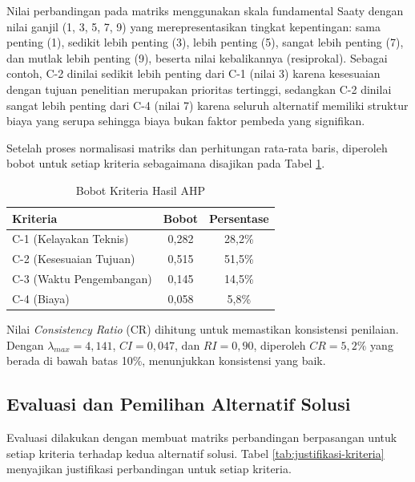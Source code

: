 Nilai perbandingan pada matriks menggunakan skala fundamental Saaty dengan nilai ganjil (1, 3, 5, 7, 9) yang merepresentasikan tingkat kepentingan: sama penting (1), sedikit lebih penting (3), lebih penting (5), sangat lebih penting (7), dan mutlak lebih penting (9), beserta nilai kebalikannya (resiprokal). Sebagai contoh, C-2 dinilai sedikit lebih penting dari C-1 (nilai 3) karena kesesuaian dengan tujuan penelitian merupakan prioritas tertinggi, sedangkan C-2 dinilai sangat lebih penting dari C-4 (nilai 7) karena seluruh alternatif memiliki struktur biaya yang serupa sehingga biaya bukan faktor pembeda yang signifikan.

Setelah proses normalisasi matriks dan perhitungan rata-rata baris, diperoleh bobot untuk setiap kriteria sebagaimana disajikan pada Tabel \ref{tab:bobot-kriteria}.

\begin{table}[H]
  \caption{Bobot Kriteria Hasil AHP}
  \label{tab:bobot-kriteria}
  \begin{tabular}{| l | c | c |}
    \hline
    \textbf{Kriteria} & \textbf{Bobot} & \textbf{Persentase} \\
    \hline
    C-1 (Kelayakan Teknis)   & 0,282 & 28,2\% \\
    \hline
    C-2 (Kesesuaian Tujuan)  & 0,515 & 51,5\% \\
    \hline
    C-3 (Waktu Pengembangan) & 0,145 & 14,5\% \\
    \hline
    C-4 (Biaya)              & 0,058 & 5,8\% \\
    \hline
  \end{tabular}
\end{table}

Nilai \textit{Consistency Ratio} (CR) dihitung untuk memastikan konsistensi penilaian. Dengan $\lambda_{max} = 4{,}141$, $CI = 0{,}047$, dan $RI = 0{,}90$, diperoleh $CR = 5{,}2\%$ yang berada di bawah batas 10\%, menunjukkan konsistensi yang baik.

\subsection{Evaluasi dan Pemilihan Alternatif Solusi}

Evaluasi dilakukan dengan membuat matriks perbandingan berpasangan untuk setiap kriteria terhadap kedua alternatif solusi. Tabel \ref{tab:justifikasi-kriteria} menyajikan justifikasi perbandingan untuk setiap kriteria.

